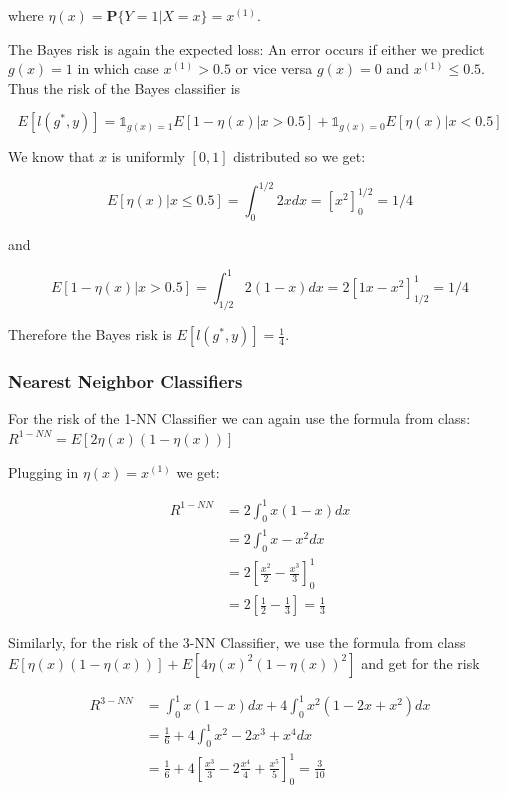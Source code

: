 \documentclass[a4paper, 11pt]{article} %
\begin{document}
where $\eta(x) = \mathbf { P } \{ Y = 1 | X = x \} = x ^ { ( 1 ) }$.

The Bayes risk is again the expected loss:
An error occurs if either we predict $g(x) = 1$ in which case $x^{(1)} > 0.5$ or vice versa $g(x) = 0$ and $x^{(1)} \leq 0.5$. Thus the risk of the Bayes classifier is


$$E\left[l(g^*,y)\right] = \mathbb{1}_{g(x) = 1}E[1- \eta(x)| x>0.5  ] + \mathbb{1}_{g(x) = 0} E[ \eta(x) | x <0.5 ]$$

We know that $x$ is uniformly $[0,1]$ distributed so we get: 

$$E[\eta(x) | x \leq 0.5] = \int _ { 0 } ^ { 1 / 2 } 2 x d x = \left[ x ^ { 2 } \right] _ { 0 } ^ { 1 / 2 } = 1 / 4$$

and

$$E[1 -\eta(x) | x > 0.5] = \int _ { 1/2 } ^ { 1 } 2 (1-x) d x =  2\left[ 1x - x ^ { 2 } \right] _ { 1/2 } ^ { 1 } = 1 / 4$$


Therefore the Bayes risk is $E\left[l(g^*,y)\right] = \frac{1}{4}$.

\subsubsection*{Nearest Neighbor Classifiers}

For the risk of the 1-NN Classifier we can again use the formula from class: $R ^ { 1 - N N } = E [ 2 \eta ( x ) ( 1 - \eta ( x ) ) ]$

Plugging in $\eta(x) =  x ^ { ( 1 ) }$ we get:

\begin{align*}
R ^ { 1 - N N } &= 2 \int _ { 0 } ^ { 1 } x ( 1 - x ) d x \\
&= 2\int _ { 0 } ^ { 1 } x - x ^ { 2 } d x \\
&= 2 \left[ \frac { x ^ { 2 } } { 2 } - \frac { x ^ { 3 } } { 3 } \right] _ { 0 } ^ { 1 } \\
&= 2 \left[ \frac { 1 } { 2 } - \frac { 1 } { 3 } \right]  = \frac{1}{3}
\end{align*}

Similarly, for the risk of the 3-NN Classifier, we use the formula from class $E [ \eta ( x ) ( 1 - \eta ( x ) ) ] + E \left[ 4 \eta ( x ) ^ { 2 } ( 1 - \eta ( x ) ) ^ { 2 } \right]$ and get for the risk

\begin{align*}
R ^ { 3 - N N } &=\int _ { 0 } ^ { 1 } x ( 1 - x ) d x + 4 \int _ { 0 } ^ { 1 } x ^ { 2 } \left( 1 - 2 x + x ^ { 2 } \right) d x \\
&= \frac { 1 } { 6 } + 4 \int _ { 0 } ^ { 1 } x ^ { 2 } - 2 x ^ { 3 } + x ^ { 4 } d x \\
&= \frac { 1 } { 6 } + 4 \left[ \frac { x ^ { 3 } } { 3 } - 2 \frac { x ^ { 4 } } { 4 } + \frac { x ^ { 5 } } { 5 } \right] _ { 0 } ^ { 1 } = \frac{3}{10}
\end{align*}
\end{document}
